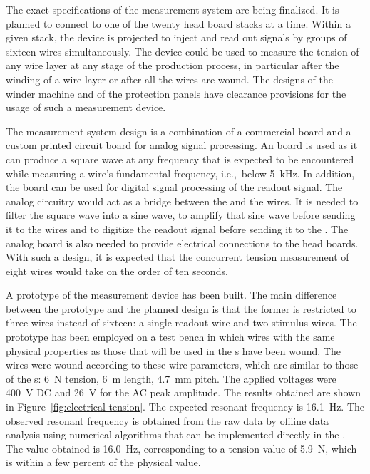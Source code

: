 The exact specifications of the measurement system are being finalized. It is planned to connect to one of the twenty head board stacks at a time. Within a given stack, the device is projected to inject and read out signals by groups of sixteen wires simultaneously. The device could be used to measure the tension of any wire layer at any stage of the production process, in particular after the winding of a wire layer or after all the wires are wound. The designs of the winder machine and of the  protection panels have clearance provisions for the usage of such a measurement device.

The measurement system design is a combination of a commercial  board and a custom printed circuit board for analog signal processing. An  board is used as it can produce a square wave at any frequency that is expected to be encountered while measuring a wire's fundamental frequency, i.e.,\ below \SI{5}{kHz}. In addition, the  board can be used for digital signal processing of the readout signal. The analog circuitry would act as a bridge between the  and the  wires. It is needed to filter the square wave into a sine wave, to amplify that sine wave before sending it to the wires and to digitize the readout signal before sending it to the . The analog board is also needed to provide electrical connections to the head boards. With such a design, it is expected that the concurrent tension measurement of eight wires would take on the order of ten seconds.

A prototype of the measurement device has been built. The main difference between the prototype and the planned design is that the former is restricted to three wires instead of sixteen: a single readout wire and two stimulus wires. The prototype has been employed on a test bench in which wires with the same physical properties as those that will be used in the s have been wound. The wires were wound according to these wire parameters, which are similar to those of the s: \SI{6}{N} tension, \SI{6}{m} length, \SI{4.7}{mm} pitch. The applied voltages were \SI{400}{V} DC and \SI{26}{V} for the AC peak amplitude. The results obtained are shown in Figure~\ref{fig:electrical-tension}. The expected resonant frequency is \SI{16.1}{Hz}. The observed resonant frequency is obtained from the raw data by offline data analysis using numerical algorithms that can be implemented directly in the . The value obtained is \SI{16.0}{Hz}, corresponding to a tension value of \SI{5.9}{N}, which is within a few percent of the physical value.


